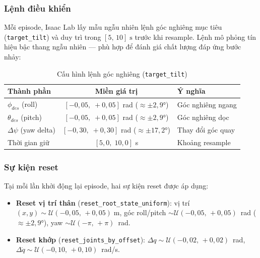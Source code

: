 \subsubsection{Lệnh điều khiển}

Mỗi episode, Isaac Lab lấy mẫu ngẫu nhiên lệnh góc nghiêng mục tiêu
(\texttt{target\_tilt}) và duy trì trong $[5,\,10]\;\text{s}$ trước khi
resample. Lệnh mô phỏng tín hiệu bậc thang ngẫu nhiên — phù hợp để
đánh giá chất lượng đáp ứng bước nhảy:

\begin{table}[H]
    \centering
    \caption{Cấu hình lệnh góc nghiêng (\texttt{target\_tilt})}
    \label{tab:tilt_cmd}
    \renewcommand{\arraystretch}{1.3}
    \begin{tabular}{|l|c|l|}
    \hline
    \textbf{Thành phần} & \textbf{Miền giá trị} & \textbf{Ý nghĩa} \\
    \hline
    $\phi_{des}$ (roll)       & $[-0{,}05,\;+0{,}05]$ rad ($\approx\pm2{,}9°$)  & Góc nghiêng ngang \\
    $\theta_{des}$ (pitch)    & $[-0{,}05,\;+0{,}05]$ rad ($\approx\pm2{,}9°$)  & Góc nghiêng dọc \\
    $\Delta\psi$ (yaw delta)  & $[-0{,}30,\;+0{,}30]$ rad ($\approx\pm17{,}2°$) & Thay đổi góc quay \\
    Thời gian giữ             & $[5{,}0,\;10{,}0]$ s & Khoảng resample \\
    \hline
    \end{tabular}
\end{table}

\subsubsection{Sự kiện reset}

Tại mỗi lần khởi động lại episode, hai sự kiện reset được áp dụng:
\begin{itemize}
    \item \textbf{Reset vị trí thân} (\texttt{reset\_root\_state\_uniform}):
    vị trí $(x,y) \sim \mathcal{U}(-0{,}05,\,+0{,}05)\;\text{m}$,
    góc roll/pitch $\sim \mathcal{U}(-0{,}05,\,+0{,}05)$~rad ($\approx\pm2{,}9°$),
    yaw $\sim \mathcal{U}(-\pi,\,+\pi)$~rad.

    \item \textbf{Reset khớp} (\texttt{reset\_joints\_by\_offset}):
    $\Delta q \sim \mathcal{U}(-0{,}02,\,+0{,}02)$~rad,
    $\Delta\dot{q} \sim \mathcal{U}(-0{,}10,\,+0{,}10)$~rad/s.
\end{itemize}

